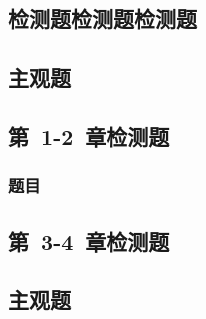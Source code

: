 \documentclass[color=BLUE]{textbook-cn}%
\begin{document}
\begin{Quiz}
\chapter{检测题检测题检测题}


\section{主观题}
\end{Quiz}






\begin{Test}
\chapter{第~1-2~章检测题}
\lipsum\lipsum\cite{7}\cite{6}
\subsection{题目}
\end{Test}

\begin{Quiz}
\chapter{第~3-4~章检测题}
\section{主观题}
\end{Quiz}



\tcbstoprecording
\end{document}
